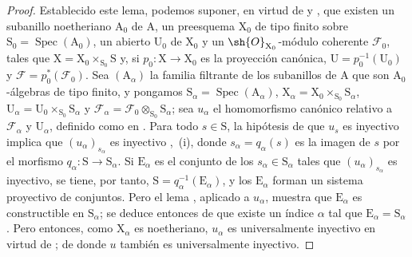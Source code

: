 \begin{proof}
Establecido este lema, podemos suponer, en virtud de  y , que existen un subanillo noetheriano $\mathrm{A}_0$ de $\mathrm{A}$, un preesquema $\mathrm{X}_0$ de tipo finito sobre $\mathrm{S}_0=\operatorname{Spec}(\mathrm{A}_0)$, un abierto $\mathrm{U}_0$ de $\mathrm{X}_0$ y un $\sh{O}_{\mathrm{X}_0}$-módulo coherente $\mathscr{F}_0$, tales que $\mathrm{X}=\mathrm{X}_0\times_{\mathrm{S}_0}\mathrm{S}$ y, si $p_0:\mathrm{X}\to\mathrm{X}_0$ es la proyección canónica, $\mathrm{U}=p_0^{-1}(\mathrm{U}_0)$ y $\mathscr{F}=p_0^*(\mathscr{F}_0)$.
Sea $(\mathrm{A}_\alpha)$ la familia filtrante de los subanillos de $\mathrm{A}$ que son $\mathrm{A}_0$-álgebras de tipo finito, y pongamos $\mathrm{S}_\alpha=\operatorname{Spec}(\mathrm{A}_\alpha)$, $\mathrm{X}_\alpha=\mathrm{X}_0\times_{\mathrm{S}_0}\mathrm{S}_\alpha$, $\mathrm{U}_\alpha=\mathrm{U}_0\times_{\mathrm{S}_0}\mathrm{S}_\alpha$ y $\mathscr{F}_\alpha=\mathscr{F}_0\otimes_{\mathrm{S}_0}\mathrm{S}_\alpha$; sea $u_\alpha$ el homomorfismo canónico relativo a $\mathscr{F}_\alpha$ y $\mathrm{U}_\alpha$, definido como en .
Para todo $s\in\mathrm{S}$, la hipótesis de que $u_s$ es inyectivo implica que $(u_\alpha)_{s_\alpha}$ es inyectivo ,~(i), donde $s_\alpha=q_\alpha(s)$ es la imagen de $s$ por el morfismo $q_\alpha:\mathrm{S}\to\mathrm{S}_\alpha$.
Si $\mathrm{E}_\alpha$ es el conjunto de los $s_\alpha\in\mathrm{S}_\alpha$ tales que $(u_\alpha)_{s_\alpha}$ es inyectivo, se tiene, por tanto, $\mathrm{S}=q_\alpha^{-1}(\mathrm{E}_\alpha)$, y los $\mathrm{E}_\alpha$ forman un sistema proyectivo de conjuntos.
Pero el lema , aplicado a $u_\alpha$, muestra que $\mathrm{E}_\alpha$ es constructible en $\mathrm{S}_\alpha$; se deduce entonces de  que existe un índice $\alpha$ tal que $\mathrm{E}_\alpha=\mathrm{S}_\alpha$.
Pero entonces, como $\mathrm{X}_\alpha$ es noetheriano, $u_\alpha$ es universalmente inyectivo en virtud de ; de donde $u$ también es universalmente inyectivo.
\medskip


\end{proof}
